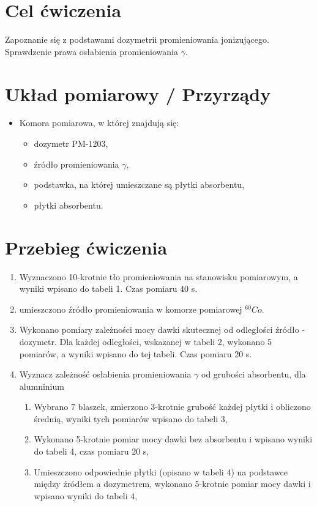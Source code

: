 \documentclass{article}
\begin{document}
\section{Cel ćwiczenia}
Zapoznanie się z podstawami dozymetrii promieniowania jonizującego. Sprawdzenie prawa osłabienia promieniowania $\gamma$.

\section{Układ pomiarowy / Przyrządy}
\begin{itemize}
 \item Komora pomiarowa, w której znajdują się:
    \begin{itemize}
    \item dozymetr PM-1203,
    \item źródło promieniowania $\gamma$,
    \item podstawka, na której umieszczane są płytki absorbentu,
    \item płytki absorbentu.
 \end{itemize}
 \end{itemize}

\section{Przebieg ćwiczenia}

\begin{enumerate}
    \item Wyznaczono 10-krotnie tło promieniowania na stanowisku pomiarowym, a wyniki wpisano do tabeli 1. Czas pomiaru 40 s. 
    \item umieszczono źródło promieniowania w komorze pomiarowej $^{60}Co$.
    \item Wykonano pomiary zależności mocy dawki skutecznej od odległości źródło - dozymetr. Dla każdej odległości, wskazanej w tabeli 2, wykonano 5 pomiarów, a wyniki wpisano do
tej tabeli. Czas pomiaru 20 s.

\item Wyznacz zależność osłabienia promieniowania $\gamma$ od grubości absorbentu, dla alumninium

\begin{enumerate}
\item Wybrano 7 blaszek, zmierzono 3-krotnie grubość każdej płytki i obliczono średnią, wyniki tych pomiarów wpisano do tabeli 3,

 \item Wykonano 5-krotnie pomiar mocy dawki bez absorbentu i wpisano wyniki do tabeli 4, czas pomiaru 20 s,

 \item Umieszczono odpowiednie płytki (opisano w tabeli 4) na podstawce między źródłem a dozymetrem, wykonano 5-krotnie pomiar mocy dawki i wpisano wyniki do tabeli 4,
 
\end{enumerate}
\end{enumerate}
\end{document}
